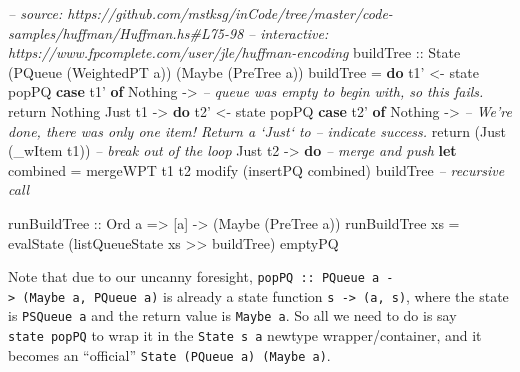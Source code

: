 \documentclass[]{article}
\newenvironment{Shaded}{}{}
\newcommand{\KeywordTok}[1]{\textcolor[rgb]{0.00,0.44,0.13}{\textbf{{#1}}}}
\newcommand{\DataTypeTok}[1]{\textcolor[rgb]{0.56,0.13,0.00}{{#1}}}
\newcommand{\CommentTok}[1]{\textcolor[rgb]{0.38,0.63,0.69}{\textit{{#1}}}}
\newcommand{\OtherTok}[1]{\textcolor[rgb]{0.00,0.44,0.13}{{#1}}}
\newcommand{\FunctionTok}[1]{\textcolor[rgb]{0.02,0.16,0.49}{{#1}}}
\newcommand{\NormalTok}[1]{{#1}}
\begin{document}
\begin{Shaded}
\begin{Highlighting}[]
\CommentTok{-- source: https://github.com/mstksg/inCode/tree/master/code-samples/huffman/Huffman.hs#L75-98}
\CommentTok{-- interactive: https://www.fpcomplete.com/user/jle/huffman-encoding}
\OtherTok{buildTree ::} \DataTypeTok{State} \NormalTok{(}\DataTypeTok{PQueue} \NormalTok{(}\DataTypeTok{WeightedPT} \NormalTok{a)) (}\DataTypeTok{Maybe} \NormalTok{(}\DataTypeTok{PreTree} \NormalTok{a))}
\NormalTok{buildTree }\FunctionTok{=} \KeywordTok{do}
    \NormalTok{t1' }\OtherTok{<-} \NormalTok{state popPQ}
    \KeywordTok{case} \NormalTok{t1' }\KeywordTok{of}
      \DataTypeTok{Nothing} \OtherTok{->}
        \CommentTok{-- queue was empty to begin with, so this fails.}
        \NormalTok{return }\DataTypeTok{Nothing}
      \DataTypeTok{Just} \NormalTok{t1 }\OtherTok{->} \KeywordTok{do}
        \NormalTok{t2' }\OtherTok{<-} \NormalTok{state popPQ}
        \KeywordTok{case} \NormalTok{t2' }\KeywordTok{of}
          \DataTypeTok{Nothing}  \OtherTok{->}
            \CommentTok{-- We're done, there was only one item!  Return a `Just` to}
            \CommentTok{-- indicate success.}
            \NormalTok{return (}\DataTypeTok{Just} \NormalTok{(_wItem t1))     }\CommentTok{-- break out of the loop}
          \DataTypeTok{Just} \NormalTok{t2 }\OtherTok{->} \KeywordTok{do}
            \CommentTok{-- merge and push}
            \KeywordTok{let} \NormalTok{combined }\FunctionTok{=} \NormalTok{mergeWPT t1 t2}
            \NormalTok{modify (insertPQ combined)}
            \NormalTok{buildTree                     }\CommentTok{-- recursive call}

\OtherTok{runBuildTree ::} \DataTypeTok{Ord} \NormalTok{a }\OtherTok{=>} \NormalTok{[a] }\OtherTok{->} \NormalTok{(}\DataTypeTok{Maybe} \NormalTok{(}\DataTypeTok{PreTree} \NormalTok{a))}
\NormalTok{runBuildTree xs }\FunctionTok{=} \NormalTok{evalState (listQueueState xs }\FunctionTok{>>} \NormalTok{buildTree) emptyPQ}
\end{Highlighting}
\end{Shaded}

Note that due to our uncanny foresight,
\texttt{popPQ\ ::\ PQueue\ a\ -\textgreater{}\ (Maybe\ a,\ PQueue\ a)} is
already a state function \texttt{s\ -\textgreater{}\ (a,\ s)}, where the state
is \texttt{PSQueue\ a} and the return value is \texttt{Maybe\ a}. So all we need
to do is say \texttt{state\ popPQ} to wrap it in the \texttt{State\ s\ a}
newtype wrapper/container, and it becomes an ``official''
\texttt{State\ (PQueue\ a)\ (Maybe\ a)}.
\end{document}
